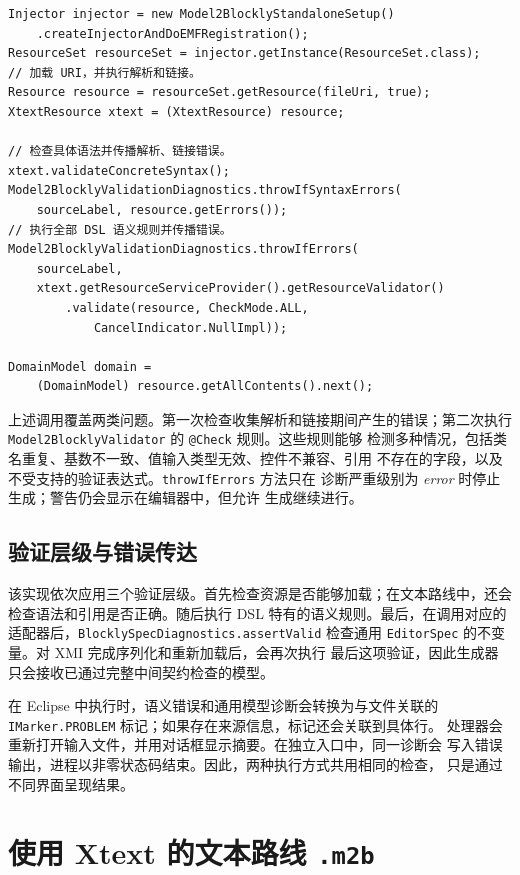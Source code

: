 \begin{lstlisting}[style=tfmjava, captionpos=t, caption={加载并验证 \texttt{.m2b} 输入的流程}, label={lst:carga-modelo-m2b}]
Injector injector = new Model2BlocklyStandaloneSetup()
    .createInjectorAndDoEMFRegistration();
ResourceSet resourceSet = injector.getInstance(ResourceSet.class);
// 加载 URI，并执行解析和链接。
Resource resource = resourceSet.getResource(fileUri, true);
XtextResource xtext = (XtextResource) resource;

// 检查具体语法并传播解析、链接错误。
xtext.validateConcreteSyntax();
Model2BlocklyValidationDiagnostics.throwIfSyntaxErrors(
    sourceLabel, resource.getErrors());
// 执行全部 DSL 语义规则并传播错误。
Model2BlocklyValidationDiagnostics.throwIfErrors(
    sourceLabel,
    xtext.getResourceServiceProvider().getResourceValidator()
        .validate(resource, CheckMode.ALL,
            CancelIndicator.NullImpl));

DomainModel domain =
    (DomainModel) resource.getAllContents().next();
\end{lstlisting}

上述调用覆盖两类问题。第一次检查收集解析和链接期间产生的错误；第二次执行
\texttt{Model2BlocklyValidator} 的 \texttt{@Check} 规则。这些规则能够
检测多种情况，包括类名重复、基数不一致、值输入类型无效、控件不兼容、引用
不存在的字段，以及不受支持的验证表达式。\texttt{throwIfErrors} 方法只在
诊断严重级别为 \emph{error} 时停止生成；警告仍会显示在编辑器中，但允许
生成继续进行。

\subsection{验证层级与错误传达}

该实现依次应用三个验证层级。首先检查资源是否能够加载；在文本路线中，还会
检查语法和引用是否正确。随后执行 DSL 特有的语义规则。最后，在调用对应的
适配器后，\texttt{BlocklySpecDiagnostics.assertValid} 检查通用
\texttt{EditorSpec} 的不变量。对 XMI 完成序列化和重新加载后，会再次执行
最后这项验证，因此生成器只会接收已通过完整中间契约检查的模型。

在 Eclipse 中执行时，语义错误和通用模型诊断会转换为与文件关联的
\texttt{IMarker.PROBLEM} 标记；如果存在来源信息，标记还会关联到具体行。
处理器会重新打开输入文件，并用对话框显示摘要。在独立入口中，同一诊断会
写入错误输出，进程以非零状态码结束。因此，两种执行方式共用相同的检查，
只是通过不同界面呈现结果。

\section{使用 Xtext 的文本路线 \texttt{.m2b}}
\label{sec:implementacion-xtext}


